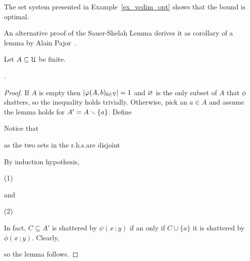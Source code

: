 \documentclass[scombinatorics.tex]{subfiles}
\begin{document}
The set system presented in Example~\ref{ex_vcdim_opt} shows that the bound is optimal.

An alternative proof of the Sauer-Shelah Lemma derives it as corollary of a lemma by Alain Pajor~\cite{pajor}.

\begin{void_thm}\label{lem_pajor}
  Let $A\subseteq\EuScript U$ be finite.
  
  .
\end{void_thm}

\begin{proof}
  If $A$ is empty then $|\varphi(A,b)_{b\in\EuScript V}|=1$ and $\varnothing$ is the only subset of $A$ that $\phi$ shatters, so the inequality holds trivially.
  Otherwise, pick an $a\in A$ and assume the lemma holds for $A'=A\smallsetminus\{a\}$.
  Define 


  Notice that
  
  
  as the two sets in the r.h.s.\@ are disjoint


  By induction hypothesis, 

  \hfill(1)
  
  and


  \hfill(2)

  In fact, $C\subseteq A'$ is shattered by $\psi(x\,;y)$ if an only if $C\cup\{a\}$ it is shattered by $\phi(x\,;y)$.
  Clearly, 


  so the lemma follows.
\end{proof}
  
\end{document}
